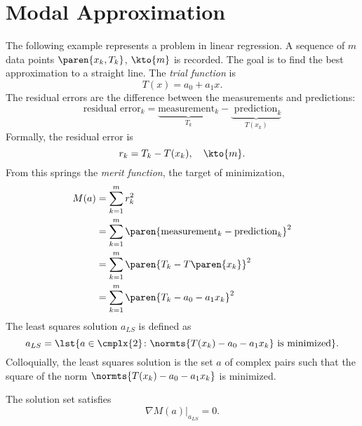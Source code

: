 \section{Modal Approximation}  %
The following example represents a problem in linear regression. A sequence of $m$ data points $\paren{x_{k}, T_{k}}$,  $\kto{m}$  is recorded. The goal is to find the best approximation to a straight line. The \emph{trial function} is
  \begin{equation*}   %
    T(x) = a_{0} + a_{1} x .
    \label{eq:lr trial}
  \end{equation*}
The residual errors are the difference between the measurements and predictions:\\
  \begin{equation*}   %
      \text{residual error}_{k} = \underbrace{\text{measurement}_{k}}_{T_{k}} - \underbrace{\text{ prediction}_{k}}_{T(x_{k})}
  \end{equation*}
Formally, the residual error is
  \begin{equation*}   %
    r_{k} = T_{k} - T(x_{k}), \quad \kto{m}.
  \end{equation*}
From this springs the \emph{merit function}, the target of minimization,
  \begin{equation}   %
  \begin{split}
    M(a) 
      &= \sum_{k=1}^{m} r_{k}^{2} \\
      &= \sum_{k=1}^{m} \paren{\text{measurement}_{k} - \text{prediction}_{k}}^{2} \\
      &= \sum_{k=1}^{m} \paren{T_{k} - T\paren{x_{k}}}^{2} \\
      &= \sum_{k=1}^{m} \paren{T_{k} - a_{0} - a_{1} x_{k}}^{2}
    \label{eqn:merit}
  \end{split}
  \end{equation}
The least squares solution $a_{LS}$ is defined as 
  \begin{equation*}   %
    a_{LS} = \lst{a \in \cmplx{2} \colon \normts{T(x_{k}) - a_{0} - a_{1} x_{k}} \text{ is minimized} }.
  \end{equation*}
Colloquially, the least squares solution is the set $a$ of complex pairs such that the square of the norm $\normts{T(x_{k}) - a_{0} - a_{1} x_{k}}$ is minimized.

The solution set satisfies
  \begin{equation}   %
    \nabla M( a )|_{a_{LS}} = 0 .
    \label{eq:gradient lr}
  \end{equation}

